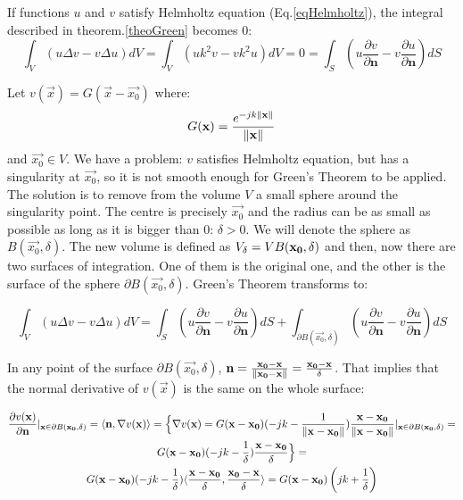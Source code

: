 If functions $u$ and $v$ satisfy Helmholtz equation (Eq.\ref{eqHelmholtz}), the integral described in theorem.\ref{theoGreen} becomes 0:
\begin{equation}
	\int_{V} \left( u \Delta v - v \Delta u \right) dV = \int_{V} \left(u k^2 v - v k^2 u \right) dV = 0 = \int_{S} \left(u\frac{\partial v}{\partial \mathbf{n}} - v \frac{\partial u}{\partial \mathbf{n}}\right) dS
	\label{eqWaveAndGreen}
\end{equation}

Let $v(\vec{x}) = G(\vec{x} - \vec{x_0})$ where:
\begin{equation}
G(\vec{x}) = \frac{e^{-j k \norm{\vec{x}} }}{\norm{\vec{x}}}
\label{eqGreensFunction}
\end{equation}
and $\vec{x_0} \in V$.
We have a problem: $v$ satisfies Helmholtz equation, but has a singularity at $\vec{x_0}$, so it is not smooth enough for Green's Theorem to be applied. The solution is to remove from the volume $V$ a small sphere around the singularity point. The centre is precisely $\vec{x_0}$ and the radius can be as small as possible as long as it is bigger than 0: $\delta > 0$. We will denote the sphere as $B(\vec{x_0}, \delta)$. The new volume is defined as $V_{\delta} = V \\ B(\vec{x_0}, \delta)$ and then, now there are two surfaces of integration. One of them is the original one, and the other is the surface of the sphere $\partial B(\vec{x_0}, \delta)$. Green's Theorem transforms to:

\begin{equation}
 \int_{V} \left( u \Delta v - v \Delta u \right) dV = \int_{S} \left(u\frac{\partial v}{\partial \mathbf{n}} - v \frac{\partial u}{\partial \mathbf{n}}\right) dS + \int_{\partial B(\vec{x_0}, \delta)} \left(u\frac{\partial v}{\partial \mathbf{n}} - v \frac{\partial u}{\partial \mathbf{n}}\right) dS
\end{equation}

In any point of the surface $\partial B(\vec{x_0}, \delta)$, $\vec{n} = \frac{\vec{x_0} - \vec{x}}{\norm{\vec{x_0} - \vec{x}}} = \frac{\vec{x_0} - \vec{x}}{\delta}$. That implies that the normal derivative of $v(\vec{x})$ is the same on the whole surface:

\begin{multline}
\frac{\partial v(\vec{x})}{\partial \vec{n}} \rvert_{\vec{x} \in \partial B(\vec{x_0}, \delta)} = \langle \vec{n} , \nabla v(\vec{x}) \rangle =
\Big\{ \nabla v(\vec{x}) = G(\vec{x} - \vec{x_0})(-jk - \frac{1}{\norm{\vec{x} - \vec{x_0}}})\frac{\vec{x} - \vec{x_0}}{\norm{\vec{x} - \vec{x_0}}}|_{\vec{x} \in \partial B(\vec{x_0}, \delta)}= \\
G(\vec{x} - \vec{x_0})(-jk - \frac{1}{\delta})\frac{\vec{x} - \vec{x_0}}{\delta} \Big\} = \\ G(\vec{x} - \vec{x_0})(-jk - \frac{1}{\delta})\langle \frac{\vec{x} - \vec{x_0}}{\delta} , \frac{\vec{x_0} - \vec{x}}{\delta} \rangle = G(\vec{x} - \vec{x_0})\left( jk + \frac{1}{\delta} \right)
\end{multline}

